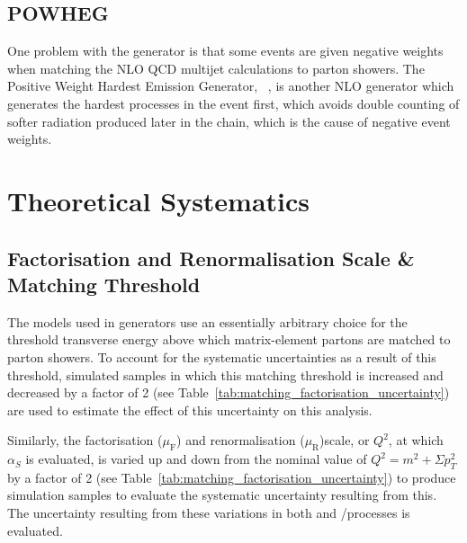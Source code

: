 \subsection{POWHEG}
\label{ss:powheg}
One problem with the \MCATNLO generator is that some events are given negative weights when matching the NLO
QCD multijet calculations to parton showers.  The Positive Weight Hardest Emission Generator,
\POWHEG~\cite{Frixione:2007vw,Nason:2004rx,Alioli:2010xd}, is another NLO generator which generates the
hardest processes in the event first, which avoids double counting of softer radiation produced later in the
chain, which is the cause of negative event weights.


\section{Theoretical Systematics}
\label{s:Theoretical Systematics}
\subsection{Factorisation and Renormalisation Scale \& Matching Threshold}
\label{ss:factorisation_and_matching_threshold}
The models used in generators use an essentially arbitrary choice for the threshold transverse energy above
which matrix-element partons are matched to parton showers. To account for the systematic uncertainties as a
result of this threshold, simulated samples in which this matching threshold is increased and decreased by a
factor of 2 (see Table~\ref{tab:matching_factorisation_uncertainty}) are used to estimate the effect of this
uncertainty on this analysis.

Similarly, the factorisation ($\mu_{\mathrm{F}}$) and renormalisation ($\mu_{\mathrm{R}}$)scale, or $Q^{2}$,
at which $\alpha_{S}$ is evaluated, is varied up and down from the nominal value of $Q^{2} = m^{2} + \Sigma
p_{T}^{2}$ by a factor of 2 (see Table~\ref{tab:matching_factorisation_uncertainty}) to produce simulation
samples to evaluate the systematic uncertainty resulting from this. The uncertainty resulting from these
variations in both \ttbar and \W/\ZpJets processes is evaluated.




